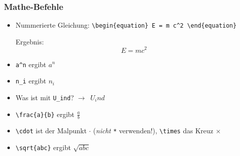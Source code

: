 \begin{frame}[<+->][fragile]
	\frametitle{Mathe-Befehle}
	
	\begin{itemize}
		\item Nummerierte Gleichung: \lstinline!\begin{equation} E = m c^2 \end{equation}!

		Ergebnis:
		\begin{equation}
			E = m c^2
		\end{equation}
		\item \lstinline!a^n! ergibt $a^n$
		\item \lstinline!n_i! ergibt $n_i$
		\item Was ist mit \lstinline!U_ind!? $\rightarrow$\ $U_ind$
		\item \lstinline!\frac{a}{b}! ergibt $\displaystyle\frac{a}{b}$
		\item \lstinline!\cdot! ist der Malpunkt $\cdot$ (\emph{nicht} \lstinline!*! verwenden!), \lstinline!\times! das Kreuz $\times$
		\item \lstinline!\sqrt{abc}! ergibt $\sqrt{abc}$
	\end{itemize}
\end{frame}

